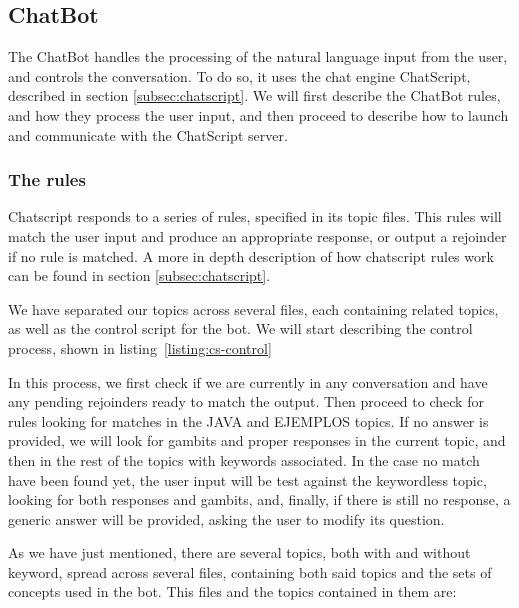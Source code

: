 \subsection{ChatBot}
\label{sec:chatbot}

The ChatBot handles the processing of the natural language input from the user, and controls the conversation. To do so, it uses the chat engine ChatScript, described in section \ref{subsec:chatscript}. We will first describe the ChatBot rules, and how they process the user input, and then proceed to describe how to launch and communicate with the ChatScript server.

\subsubsection{The rules}

Chatscript responds to a series of rules, specified in its topic files. This rules will match the user input and produce an appropriate response, or output a rejoinder if no rule is matched. A more in depth description of how chatscript rules work can be found in section \ref{subsec:chatscript}.

We have separated our topics across several files, each containing related topics, as well as the control script for the bot. We will start describing the control process, shown in listing~\ref{listing:cs-control}

\begin{center}
  
\end{center}

In this process, we first check if we are currently in any conversation and have any pending rejoinders ready to match the output. Then proceed to check for rules looking for matches in the JAVA and EJEMPLOS topics. If no answer is provided, we will look for gambits and proper responses in the current topic, and then in the rest of the topics with keywords associated. In the case no match have been found yet, the user input will be test against the keywordless topic, looking for both responses and gambits, and, finally, if there is still no response, a generic answer will be provided, asking the user to modify its question.

As we have just mentioned, there are several topics, both with and without keyword, spread across several files, containing both said topics and the sets of concepts used in the bot. This files and the topics contained in them are:

